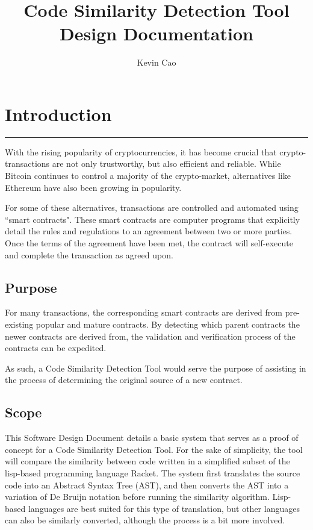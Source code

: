 \documentclass[12pt]{article}
\title{Code Similarity Detection Tool\\
Design Documentation}
\author{Kevin Cao}
\newcommand{\usection}[1]{\section{#1}\hrule\hfill}
\begin{document}
\maketitle

\tableofcontents

\usection{Introduction}

With the rising popularity of cryptocurrencies, it has become crucial that crypto-transactions are not only trustworthy, but also efficient and reliable. While Bitcoin continues to control a majority of the crypto-market, alternatives like Ethereum have also been growing in popularity.

\hfill

For some of these alternatives, transactions are controlled and automated using ``smart contracts". These smart contracts are computer programs that explicitly detail the rules and regulations to an agreement between two or more parties. Once the terms of the agreement have been met, the contract will self-execute and complete the transaction as agreed upon.

\subsection{Purpose}
For many transactions, the corresponding smart contracts are derived from pre-existing popular and mature contracts. By detecting which parent contracts the newer contracts are derived from, the validation and verification process of the contracts can be expedited.

\hfill

As such, a Code Similarity Detection Tool would serve the purpose of assisting in the process of determining the original source of a new contract.

\subsection{Scope}

This Software Design Document details a basic system that serves as a proof of concept for a Code Similarity Detection Tool. For the sake of simplicity, the tool will compare the similarity between code written in a simplified subset of the lisp-based programming language Racket. The system first translates the source code into an Abstract Syntax Tree (AST), and then converts the AST into a variation of De Bruijn notation before running the similarity algorithm. Lisp-based languages are best suited for this type of translation, but other languages can also be similarly converted, although the process is a bit more involved.
\end{document}
